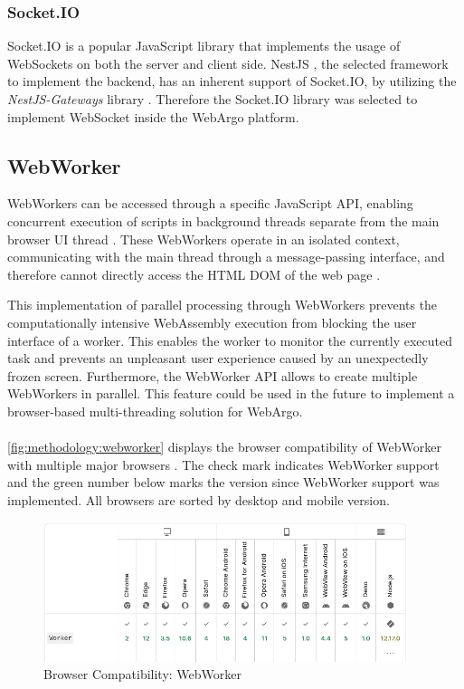 \subsubsection{Socket.IO}
Socket.IO \cite{methodology:websockets2} is a popular JavaScript library that implements the usage of WebSockets on both the server and client side. NestJS \cite{methodology:nestjs}, the selected framework to implement the backend, has an inherent support of Socket.IO, by utilizing the \emph{NestJS-Gateways} library \cite{methodology:nestjs}. Therefore the Socket.IO library was selected to implement WebSocket inside the WebArgo platform.

\subsection{WebWorker}
\label{sec:methodology:webworker}
WebWorkers can be accessed through a specific JavaScript \ac{API}, enabling concurrent execution of scripts in background threads separate from the main browser UI thread \cite{methodology:webworkers}. These WebWorkers operate in an isolated context, communicating with the main thread through a message-passing interface, and therefore cannot directly access the \acs{HTML} \acs{DOM} of the web page \cite{methodology:webworkers}. 

This implementation of parallel processing through WebWorkers prevents the computationally intensive WebAssembly execution from blocking the user interface of a worker. This enables the worker to monitor the currently executed task and prevents an unpleasant user experience caused by an unexpectedly frozen screen. Furthermore, the WebWorker \ac{API} allows to create multiple WebWorkers in parallel. This feature could be used in the future to implement a browser-based multi-threading solution for WebArgo.
\\~\\
\autoref{fig:methodology:webworker} displays the browser compatibility of WebWorker with multiple major browsers \cite{methodology:webworkers}. The check mark indicates WebWorker support and the green number below marks the version since WebWorker support was implemented. All browsers are sorted by desktop and mobile version.
\newpage
\begin{figure}[htbp]
  \centering
  \includegraphics[width=0.95\textwidth]{gfx/figures/webworker-browsercompability.png}
  \caption{Browser Compatibility: WebWorker \cite{methodology:webworkers}}
  \label{fig:methodology:webworker}
\end{figure}

